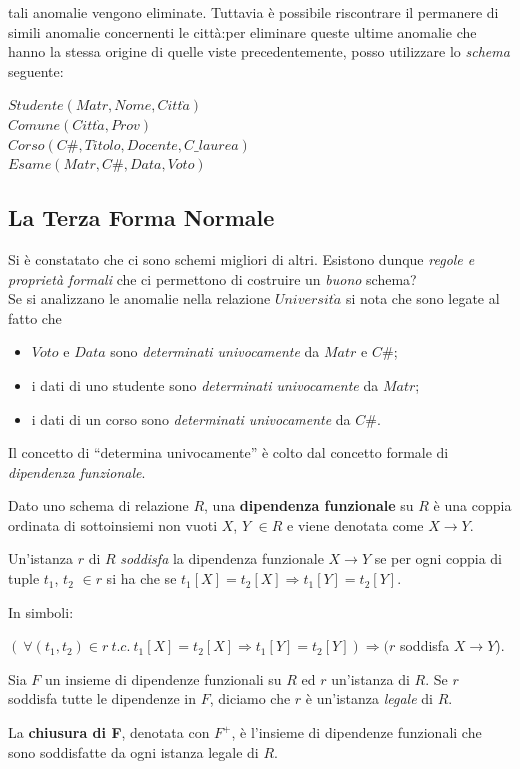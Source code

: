 tali anomalie vengono eliminate. Tuttavia è possibile riscontrare il permanere di simili 
anomalie concernenti le città:per eliminare queste ultime anomalie che hanno la stessa 
origine di quelle viste precedentemente, posso utilizzare lo \emph{schema} seguente:
\begin{center}
  $Studente(Matr,Nome,Citt\grave{a})$\\
  $Comune(Citt\grave{a},Prov)$\\
  $Corso(C\#,Titolo,Docente, C\_laurea)$\\
  $Esame(Matr, C\#, Data,Voto)$
\end{center}

\subsection{La Terza Forma Normale}
Si è constatato che ci sono schemi migliori di altri. Esistono dunque \emph{regole 
e proprietà formali} che ci permettono di costruire un \emph{buono} schema?\\
Se si analizzano le anomalie nella relazione $Universit\grave{a}$ si nota che sono 
legate al fatto che
\begin{itemize}
 \item $Voto$ e $Data$ sono \emph{determinati univocamente} da $Matr$ e $C\#$;
 \item  i dati di uno studente sono \emph{determinati univocamente} da $Matr$;
 \item i dati di un corso sono \emph{determinati univocamente} da $C\#$.
\end{itemize}
Il concetto di ``determina univocamente'' è colto dal concetto formale di \emph{dipendenza funzionale}.
\begin{defn}
  Dato uno schema di relazione $R$, una \textbf{dipendenza funzionale} su $R$ 
  è una coppia ordinata di sottoinsiemi non vuoti $X$, $Y$ $\in R$ e viene denotata 
  come $X \rightarrow Y$.
\end{defn}
\begin{prop}
Un'istanza $r$ di $R$ \emph{soddisfa} la dipendenza funzionale $X \rightarrow Y$
se per ogni coppia di tuple $t_1$, $t_2$ $\in r$ si ha che se $t_1[X] = t_2[X] 
\Rightarrow t_1[Y] = t_2[Y]$. 
\end{prop}
In simboli:
\begin{center}
\begin{math}
(\ \forall (t_1, t_2) \in r\ t.c.\ t_1[X] = t_2[X] \Rightarrow t_1[Y] = t_2[Y]) 
\Rightarrow (r
\end{math}
soddisfa $X\rightarrow Y$).
\end{center}
Sia $F$ un insieme di dipendenze funzionali su $R$ ed $r$ un'istanza di $R$. Se $r$ 
soddisfa tutte le dipendenze in $F$, diciamo che $r$ è un'istanza \emph{legale} di $R$. 
\begin{defn}
La \textbf{chiusura di F}, denotata con $F^+$, è l'insieme di dipendenze funzionali che 
sono soddisfatte da ogni istanza legale di $R$. 
\end{defn}

